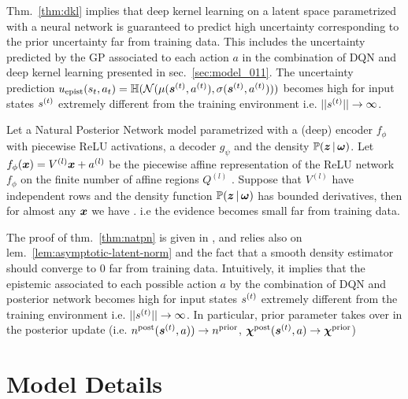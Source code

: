 Thm.~\ref{thm:dkl} implies that deep kernel learning on a latent space parametrized with a neural network is guaranteed to predict high uncertainty corresponding to the prior uncertainty far from training data. This includes the uncertainty predicted by the GP associated to each action $a$ in the combination of DQN and deep kernel learning presented in sec.~\ref{sec:model_011}. The uncertainty prediction $u_\text{epist}(s_t, a_t) = \operatorname{\mathbb{H}}(\operatorname{\mathcal{N}}(\mu(\bm{s}^{(t)}, a^{(t)}), \sigma(\bm{s}^{(t)}, a^{(t)})))$ becomes high for input states $s^{(t)}$ extremely different from the training environment i.e. $||s^{(t)}|| \rightarrow \infty$.

\begin{theorem}
\label{thm:natpn}
\cite{natpn} Let a Natural Posterior Network model parametrized with a (deep) encoder $f_{\phi}$ with piecewise ReLU activations, a decoder $g_{\psi}$ and the density $\mathbb{P}(\bm{z} \,|\, \bm{\omega})$. Let $f_{\phi}(\bm{x})= V^{(l)}\bm{x} + a^{(l)}$ be the piecewise affine representation of the ReLU network $f_{\phi}$ on the finite number of affine regions $Q^{(l)}$ \citep{understanding-nn-relu}. Suppose that $V^{(l)}$ have independent rows and the density function $\mathbb{P}(\bm{z} \,|\, \bm{\omega})$ has bounded derivatives, then for almost any $\bm{x}$ we have . i.e the evidence becomes small far from training data.
\end{theorem}

The proof of thm.~\ref{thm:natpn} is given in \cite{natpn}, and relies also on lem.~\ref{lem:asymptotic-latent-norm} and the fact that a smooth density estimator should converge to $0$ far from training data. Intuitively, it implies that the epistemic associated to each possible action $a$ by the combination of DQN and posterior network becomes high for input states $s^{(t)}$ extremely different from the training environment i.e. $||s^{(t)}|| \rightarrow \infty$. In particular, prior parameter takes over in the posterior update (i.e. $n^\text{post}(\bm{s}^{(t)}, a)) \rightarrow n^\text{prior}$, $\bm{\chi}^\text{post}(\bm{s}^{(t)}, a) \rightarrow \bm{\chi}^\text{prior}$)

\section{Model Details}
\label{app:models-details}

